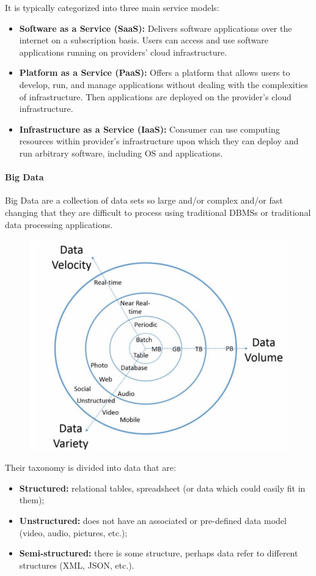 It is typically categorized into three main service models:
\begin{itemize}
    \item \textbf{Software as a Service (SaaS):} Delivers software applications over the internet on a subscription basis. Users can access and use software applications running on providers' cloud infrastructure.
    \item \textbf{Platform as a Service (PaaS):} Offers a platform that allows users to develop, run, and manage applications without dealing with the complexities of infrastructure. Then applications are deployed on the provider's cloud infrastructure.
    \item \textbf{Infrastructure as a Service (IaaS):} Consumer can use computing resources within provider’s infrastructure upon which they can deploy and run arbitrary software, including OS and applications.
\end{itemize}

\paragraph{Big Data}
Big Data are a collection of data sets so large and/or complex and/or fast changing that they are difficult to process using traditional DBMSs or traditional data processing applications.
\begin{figure}[ht!]
    \centering
    \includegraphics[scale=0.7]{images/BigData_definition.jpg}
\end{figure}

Their taxonomy is divided into data that are:
\begin{itemize}
    \item \textbf{Structured:} relational tables, spreadsheet (or data which could easily fit in them);
    \item \textbf{Unstructured:} does not have an associated or pre-defined data model (video, audio, pictures, etc.);
    \item \textbf{Semi-structured:} there is some structure, perhaps data refer to different structures (XML, JSON, etc.).
\end{itemize}
